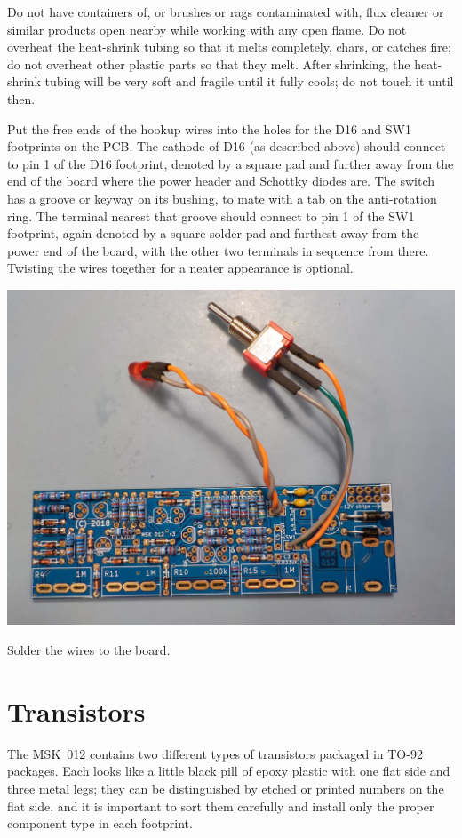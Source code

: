 Do not have containers of, or brushes or rags contaminated with, flux
cleaner or similar products open nearby while working with any open flame. 
Do not overheat the heat-shrink tubing so that it melts completely, chars,
or catches fire; do not overheat other plastic parts so that they melt. 
After shrinking, the heat-shrink tubing will be very soft and fragile until
it fully cools; do not touch it until then.

Put the free ends of the hookup wires into the holes for the D16 and SW1
footprints on the PCB.  The cathode of D16 (as described above) should
connect to pin 1 of the D16 footprint, denoted by a square pad and further
away from the end of the board where the power header and Schottky diodes
are.  The switch has a groove or keyway on its bushing, to mate with a tab
on the anti-rotation ring.  The terminal nearest that groove should connect
to pin 1 of the SW1 footprint, again denoted by a square solder pad and
furthest away from the power end of the board, with the other two terminals
in sequence from there.  Twisting the wires together for a neater appearance
is optional.

\noindent\includegraphics[width=\linewidth]{wires-to-board.jpg}

Solder the wires to the board.

\section{Transistors}

The MSK~012 contains two different types of transistors packaged in TO-92
packages.  Each looks like a little black pill of epoxy plastic with one
flat side and three metal legs; they can be distinguished by etched or
printed numbers on the flat side, and it is important to sort them carefully
and install only the proper component type in each footprint.


